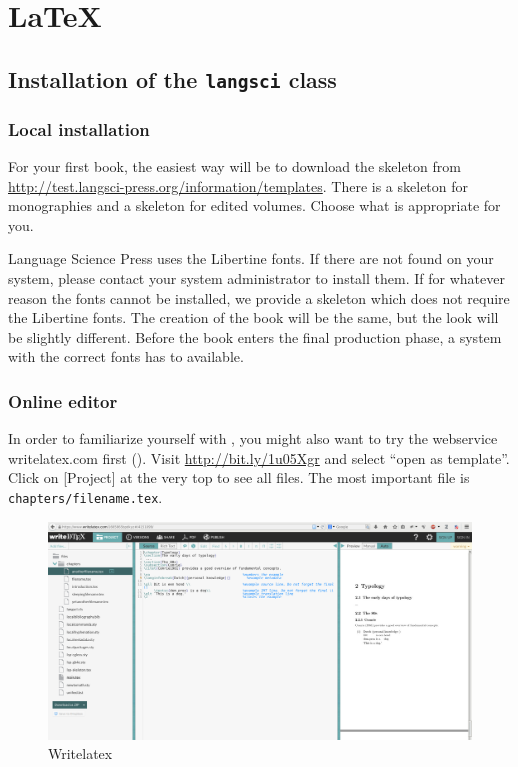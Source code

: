 \chapter{\LaTeX}

\section{Installation of the \texttt{langsci} class}
\subsection{Local installation}
For your first book, the easiest way will be to download the skeleton from \url{http://test.langsci-press.org/information/templates}.
There is a skeleton for monographies and a skeleton for edited volumes. Choose what is appropriate for you.
 

Language Science Press uses the Libertine fonts. If there are not found on your system, please contact your system administrator to install them. If for whatever reason the fonts cannot be installed, we provide a skeleton which does not require the Libertine fonts. The creation of the book will be the same, but the look will be slightly different. Before the book enters the final production phase, a system with the correct fonts has to available. 

\subsection{Online editor}
In order to familiarize yourself with \latex, you might also want to try the webservice writelatex.com first (). Visit \url{http://bit.ly/1u05Xgr} and select ``open as template''. Click on [Project] at the very top to see all files. The most important file is \verb+chapters/filename.tex+.

\begin{figure}
 \includegraphics[width=\textwidth]{writelatex.png}
  \caption{Writelatex}
  \label{fig:latex:writelatex}
\end{figure}

